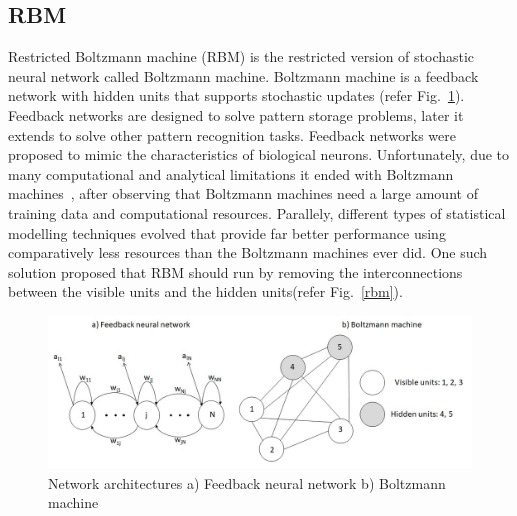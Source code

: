 \begin{spacing}{1.5}
\section{RBM}
Restricted Boltzmann machine (RBM) is the restricted version of stochastic neural network called Boltzmann machine. Boltzmann machine is a feedback network with hidden units that supports stochastic updates (refer Fig.~\ref{fig:FBNN_n_BM}). Feedback networks are designed to solve pattern storage problems, later it extends to solve other pattern recognition tasks. Feedback networks were proposed to mimic the characteristics of biological neurons. Unfortunately, due to many computational and analytical limitations it ended with Boltzmann machines~\cite{yegnanarayana2009artificial}, after observing that Boltzmann machines need a large amount of training data and computational resources. Parallely, different types of statistical modelling techniques evolved that provide far better performance using comparatively less resources than the Boltzmann machines ever did. One such solution proposed that RBM should run by removing the interconnections between the visible units and the hidden units(refer Fig.~\ref{rbm}). 

\begin{figure}[h]
    \centering
    \includegraphics[scale=0.7]{Chapters/Figures/Figure_1_horizontal.jpg}
    \caption{Network architectures a) Feedback neural network b) Boltzmann machine}
    \label{fig:FBNN_n_BM}
\end{figure}


\end{spacing}
